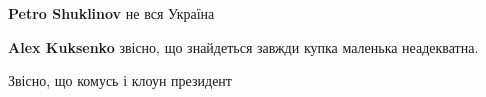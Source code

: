 \begin{itemize}
\begin{itemize}
\textbf{Petro Shuklinov} не вся Україна

 
\textbf{Alex Kuksenko} звісно, що знайдеться завжди купка маленька неадекватна.

 
Звісно, що комусь і клоун президент
\end{itemize}


\end{itemize}

